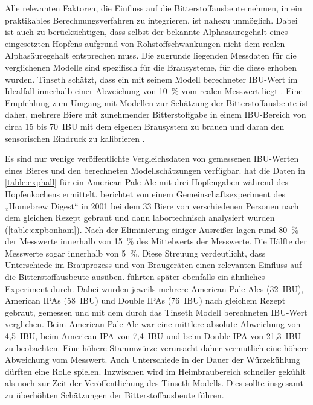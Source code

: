 \documentclass[a4paper,parskip=half]{scrartcl}
\begin{document}
Alle relevanten Faktoren, die Einfluss auf die Bitterstoffausbeute nehmen, in ein praktikables Berechnungsverfahren zu integrieren, ist nahezu unmöglich. Dabei ist auch zu berücksichtigen, dass selbst der bekannte Alphasäuregehalt eines eingesetzten Hopfens aufgrund von Rohstoffschwankungen nicht dem realen Alphasäuregehalt entsprechen muss. Die zugrunde liegenden Messdaten für die verglichenen Modelle sind spezifisch für die Brausysteme, für die diese erhoben wurden. Tinseth schätzt, dass ein mit seinem Modell berechneter IBU-Wert im Idealfall innerhalb einer Abweichung von 10~\% vom realen Messwert liegt \parencite[22:05-23:00]{Smith2011}. Eine Empfehlung zum Umgang mit Modellen zur Schätzung der Bitterstoffausbeute ist daher, mehrere Biere mit zunehmender Bitterstoffgabe in einem IBU-Bereich von circa 15 bis 70~IBU mit dem eigenen Brausystem zu brauen und daran den sensorischen Eindruck zu kalibrieren \parencite{Beechum2017}.

Es sind nur wenige veröffentlichte Vergleichsdaten von gemessenen IBU-Werten eines Bieres und den berechneten Modellschätzungen verfügbar. \textcite{Hall1997} hat die Daten in \autoref{table:exphall} für ein American Pale Ale mit drei Hopfengaben während des Hopfenkochens ermittelt. \textcite{Bonham2001} berichtet von einem Gemeinschaftsexperiment des „Homebrew Digest“ in 2001 bei dem 33 Biere von verschiedenen Personen nach dem gleichen Rezept gebraut und dann labortechnisch analysiert wurden (\autoref{table:expbonham}). Nach der Eliminierung einiger Ausreißer lagen rund 80~\% der Messwerte innerhalb von 15~\% des Mittelwerts der Messwerte. Die Hälfte der Messwerte sogar innerhalb von 5~\%. Diese Streuung verdeutlicht, dass Unterschiede im Brauprozess und von Braugeräten einen relevanten Einfluss auf die Bitterstoffausbeute ausüben. \textcite{Beechum2017} führten später ebenfalls ein ähnliches Experiment durch. Dabei wurden jeweils mehrere American Pale Ales (32~IBU), American IPAs (58~IBU) und Double IPAs (76~IBU) nach gleichem Rezept gebraut, gemessen und mit dem durch das Tinseth Modell berechneten IBU-Wert verglichen. Beim American Pale Ale war eine mittlere absolute Abweichung von 4,5~IBU, beim American IPA von 7,4~IBU und beim Double IPA von 21,3~IBU zu beobachten. Eine höhere Stammwürze verursacht daher vermutlich eine höhere Abweichung vom Messwert. Auch Unterschiede in der Dauer der Würzekühlung dürften eine Rolle spielen. Inzwischen wird im Heimbraubereich schneller gekühlt als noch zur Zeit der Veröffentlichung des Tinseth Modells. Dies sollte insgesamt zu überhöhten Schätzungen der Bitterstoffausbeute führen.
\end{document}
